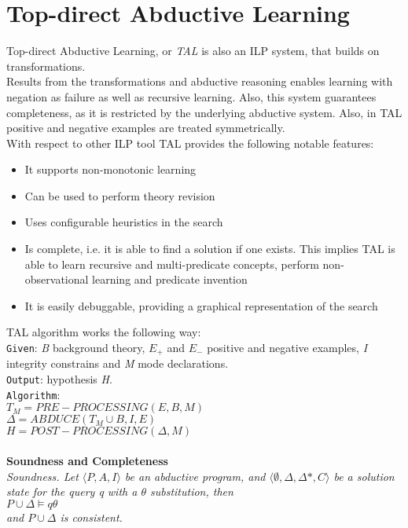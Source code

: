 \documentclass[11pt]{article}
\begin{document}
\section{Top-direct Abductive Learning}
Top-direct Abductive Learning, or \emph{TAL} is also an ILP system, that builds on transformations. \\
Results from the transformations and abductive reasoning enables learning with negation as failure as well as recursive learning. Also, this system guarantees completeness, as it is restricted by the underlying abductive system. Also, in TAL positive and negative examples are treated symmetrically. \\
With respect to other ILP tool TAL provides the following notable
features:
\begin{itemize}
\item It supports non-monotonic learning
\item Can be used to perform theory revision
\item Uses configurable heuristics in the search
\item Is complete, i.e. it is able to find a solution if one exists. This implies TAL is able to
learn recursive and multi-predicate concepts, perform non-observational learning and
predicate invention
\item It is easily debuggable, providing a graphical representation of the search
\end{itemize}

TAL algorithm works the following way: \\
\texttt{Given}: \emph{B} background theory, \emph{$E_+$} and \emph{$E_-$} positive and negative examples, \emph{I} integrity constrains and \emph{M} mode declarations.\\
\texttt{Output}: hypothesis \emph{H}.\\
\texttt{Algorithm}:\\
\texttt{$T_M = PRE-PROCESSING(E, B, M)$}\\
\texttt{$\Delta = ABDUCE(T_M \cup B, I, E)$}\\
\texttt{$H = POST-PROCESSING(\Delta , M)$}

\paragraph{}
\textbf{Soundness and Completeness}\\

\emph{Soundness. Let $\langle P, A, I \rangle$ be an abductive program, and $\langle \emptyset , \Delta , \Delta *, C \rangle$ be a solution state for the query q with a $\theta$ substitution, then\\ 
$ P \cup \Delta \models q\theta$ \\
and $P \cup \Delta$ is consistent.}\\
\end{document}
